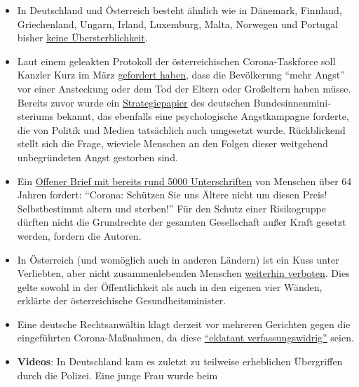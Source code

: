 \begin{itemize}
\tightlist
\item
  In Deutschland und Österreich besteht ähnlich wie in Dänemark,
  Finnland, Griechenland, Ungarn, Irland, Luxemburg, Malta, Norwegen und
  Portugal bisher \href{https://www.euromomo.eu/graphs-and-maps/}{keine
  Übersterblichkeit}.
\item
  Laut einem geleakten Protokoll der österreichischen Corona-Taskforce
  soll Kanzler Kurz im März
  \href{https://www.derstandard.de/story/2000117131591/sitzungsprotokoll-der-taskforce-corona-ueber-zu-wenig-angst-in-der}{gefordert
  haben}, dass die Bevölkerung ``mehr Angst'' vor einer Ansteckung oder
  dem Tod der Eltern oder Großeltern haben müsse. Bereits zuvor wurde
  ein
  \href{https://fragdenstaat.de/dokumente/4123-wie-wir-covid-19-unter-kontrolle-bekommen/}{Strategiepapier}
  des deutschen Bundes­­innen­­mini­steriums bekannt, das ebenfalls eine
  psychologische Angstkampagne forderte, die von Politik und Medien
  tatsächlich auch umgesetzt wurde. Rückblickend stellt sich die Frage,
  wieviele Menschen an den Folgen dieser weitgehend unbegründeten Angst
  gestorben sind.
\item
  Ein
  \href{https://www.change.org/p/bundeskanzlerin-corona-sch\%C3\%BCtzen-sie-\%C3\%A4ltere-nicht-um-diesen-preis-selbstbestimmt-altern-und-sterben}{Offener
  Brief mit bereits rund 5000 Unterschriften} von Menschen über 64
  Jahren fordert: ``Corona: Schützen Sie uns Ältere nicht um diesen
  Preis! Selbstbestimmt altern und sterben!'' Für den Schutz einer
  Risikogruppe dürften nicht die Grundrechte der gesamten Gesellschaft
  außer Kraft gesetzt werden, fordern die Autoren.
\item
  In Österreich (und womöglich auch in anderen Ländern) ist ein Kuss
  unter Verliebten, aber nicht zusammenlebenden Menschen
  \href{https://www.unsertirol24.com/2020/04/29/oeffentliches-kuessen-wird-unter-strafe-gestellt/}{weiterhin
  verboten}. Dies gelte sowohl in der Öffentlichkeit als auch in den
  eigenen vier Wänden, erklärte der österreichische
  Gesundheitsminister.\\
\item
  Eine deutsche Rechtsanwältin klagt derzeit vor mehreren Gerichten
  gegen die eingeführten Corona-Maßnahmen, da diese
  \href{https://www.rubikon.news/artikel/eklatant-verfassungswidrig-2}{``eklatant
  verfassungswidrig''} seien.
\item
  \textbf{Videos}: In Deutschland kam es zuletzt zu teilweise
  erheblichen Übergriffen durch die Polizei. Eine junge Frau wurde beim

\end{itemize}
